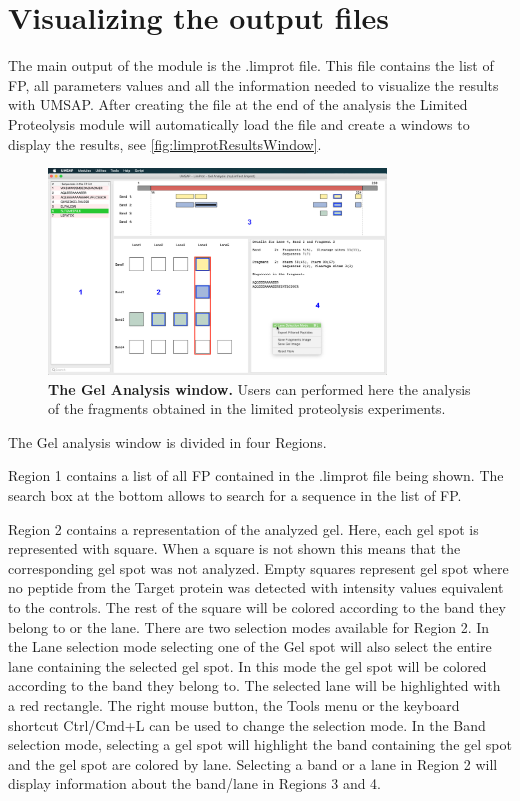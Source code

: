 \section{Visualizing the output files}

The main output of the module is the .limprot file. This file contains the list of FP,  all parameters values and all the information needed to visualize the results with UMSAP. After creating the file at the end of the analysis the Limited Proteolysis module will automatically load the file and create a windows to display the results, see \autoref{fig:limprotResultsWindow}.

\begin{figure}[h]
	\centering
	\includegraphics[width=0.8\textwidth]{./IMAGES/MOD-LIMPROT/limprot-frag.jpg}	    
	\caption[The Gel Analysis window]{\textbf{The Gel Analysis window.} Users can performed here the analysis of the fragments obtained in the limited proteolysis experiments.} 
	\label{fig:limprotResultsWindow}
	\vspace{-5pt} 	
\end{figure}

The Gel analysis window is divided in four Regions.

Region \num{1} contains a list of all FP contained in the .limprot file being shown. The search box at the bottom allows to search for a sequence in the list of FP. 

Region \num{2} contains a representation of the analyzed gel. Here, each gel spot is represented with square. When a square is not shown this means that the corresponding gel spot was not analyzed. Empty squares represent gel spot where no peptide from the Target protein was detected with intensity values equivalent to the controls. The rest of the square will be colored according to the band they belong to or the lane. There are two selection modes available for Region \num{2}. In the Lane selection mode selecting one of the Gel spot will also select the entire lane containing the selected gel spot. In this mode the gel spot will be colored according to the band they belong to. The selected lane will be highlighted with a red rectangle. The right mouse button, the Tools menu or the keyboard shortcut Ctrl/Cmd+L can be used to change the selection mode. In the Band selection mode, selecting a gel spot will highlight the band containing the gel spot and the gel spot are colored by lane. Selecting a band or a lane in Region \num{2} will display information about the band/lane in Regions \num{3} and \num{4}.

